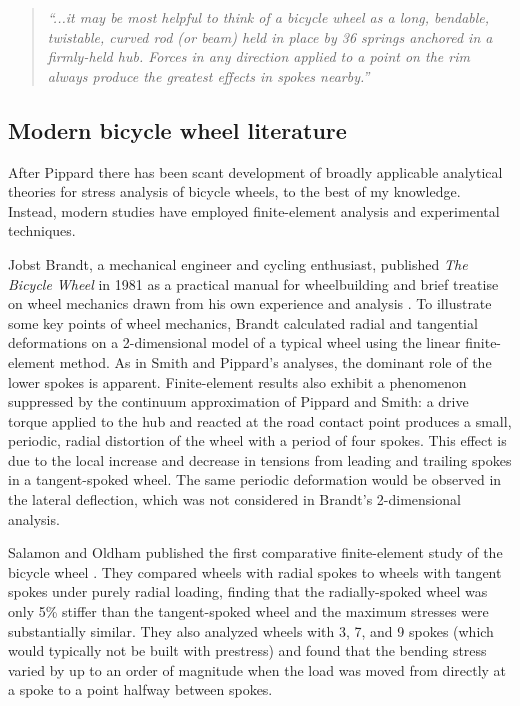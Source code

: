 \documentclass[../thesis.tex]{subfiles}
\begin{document}
\begin{quote}
\emph{``...it may be most helpful to think of a bicycle wheel as a long, bendable, twistable, curved rod (or beam) held in place by 36 springs anchored in a firmly-held hub. Forces in any direction applied to a point on the rim always produce the greatest effects in spokes nearby.''}
\end{quote}

\subsection{Modern bicycle wheel literature}

After Pippard there has been scant development of broadly applicable analytical theories for stress analysis of bicycle wheels, to the best of my knowledge. Instead, modern studies have employed finite-element analysis and experimental techniques.

Jobst Brandt, a mechanical engineer and cycling enthusiast, published \emph{The Bicycle Wheel} in 1981 as a practical manual for wheelbuilding and brief treatise on wheel mechanics drawn from his own experience and analysis \cite{Brandt1993}. To illustrate some key points of wheel mechanics, Brandt calculated radial and tangential deformations on a 2-dimensional model of a typical wheel using the linear finite-element method. As in Smith and Pippard's analyses, the dominant role of the lower spokes is apparent. Finite-element results also exhibit a phenomenon suppressed by the continuum approximation of Pippard and Smith: a drive torque applied to the hub and reacted at the road contact point produces a small, periodic, radial distortion of the wheel with a period of four spokes. This effect is due to the local increase and decrease in tensions from leading and trailing spokes in a tangent-spoked wheel. The same periodic deformation would be observed in the lateral deflection, which was not considered in Brandt's 2-dimensional analysis.

Salamon and Oldham published the first comparative finite-element study of the bicycle wheel \cite{Salamon1992}. They compared wheels with radial spokes to wheels with tangent spokes under purely radial loading, finding that the radially-spoked wheel was only 5\% stiffer than the tangent-spoked wheel and the maximum stresses were substantially similar. They also analyzed wheels with 3, 7, and 9 spokes (which would typically not be built with prestress) and found that the bending stress varied by up to an order of magnitude when the load was moved from directly at a spoke to a point halfway between spokes.
\end{document}
